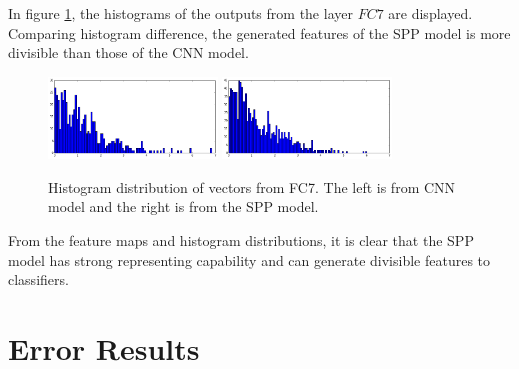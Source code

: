 In figure \ref{fig:fc7_hist_output}, the histograms of the outputs from the layer $FC7$ are displayed. Comparing histogram difference, the generated features of the SPP model is more divisible than those of the CNN model.
\begin{figure}[htb]
    \centering
	\includegraphics[width=0.4\textwidth]{sunny2_hist_caffe_fc7.png}
	\includegraphics[width=0.4\textwidth]{sunny2_hist_spp_fc7.png}
    \caption{Histogram distribution of vectors from FC7. The left is from CNN model and the right is from the SPP model.}%
    \label{fig:fc7_hist_output}%
\end{figure}

From the feature maps and histogram distributions, it is clear that the SPP model has strong representing capability and can generate divisible features to classifiers.

\section{Error Results}

